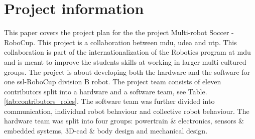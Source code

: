 \section{Project information}
\label{section:project_information}

This paper covers the project plan for the the project Multi-robot Soccer - RoboCup. This project is a collaboration between \ac{mdu}, \ac{udea} and \ac{utp}. This collaboration is part of the internationalization of the Robotics program at \ac{mdu} and is meant to improve the students skills at working in larger multi cultured groups. The project is about developing both the hardware and the software for one \ac{ssl}-RoboCup division B robot. 
The project team consists of eleven contributors split into a hardware and a software team, see Table.\:\ref{tab:contributors_roles}. 
The software team was further divided into communication, individual robot behaviour and collective robot behaviour.
The hardware team was split into four groups: powertrain \& electronics, sensors \& embedded systems, 3D-\acs{cad} \& body design and mechanical design.

